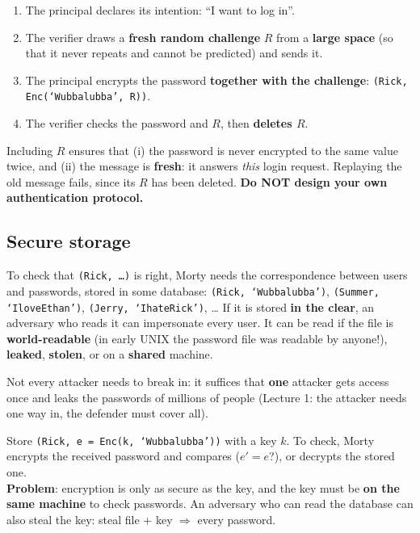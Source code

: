 \begin{defnbox}[title=Challenge-response protocols (solution to replay attacks)]
\begin{enumerate}
  \item The principal declares its intention: ``I want to log in''.
  \item The verifier draws a \textbf{fresh random challenge} $R$ from a \textbf{large space} (so
        that it never repeats and cannot be predicted) and sends it.
  \item The principal encrypts the password \textbf{together with the challenge}:
        \texttt{(Rick, Enc(`Wubbalubba', R))}.
  \item The verifier checks the password and $R$, then \textbf{deletes $R$}.
\end{enumerate}
Including $R$ ensures that (i) the password is never encrypted to the same value twice, and (ii)
the message is \textbf{fresh}: it answers \emph{this} login request. Replaying the old message
fails, since its $R$ has been deleted. \textbf{Do NOT design your own authentication protocol.}
\end{defnbox}

\subsection{Secure storage}

\begin{defnbox}[title=Why storage matters]
To check that \texttt{(Rick, \ldots)} is right, Morty needs the correspondence between users and
passwords, stored in some database: \texttt{(Rick, `Wubbalubba')}, \texttt{(Summer,
`IloveEthan')}, \texttt{(Jerry, `IhateRick')}, \ldots{} If it is stored \textbf{in the clear}, an
adversary who reads it can impersonate every user. It can be read if the file is
\textbf{world-readable} (in early UNIX the password file was readable by anyone!),
\textbf{leaked}, \textbf{stolen}, or on a \textbf{shared} machine.
\end{defnbox}

\begin{warnbox}[title=Asymmetry attacker vs.\ defender]
Not every attacker needs to break in: it suffices that \textbf{one} attacker gets access once
and leaks the passwords of millions of people (Lecture 1: the attacker needs one way in, the
defender must cover all).
\end{warnbox}

\begin{defnbox}[title={Option 1: store passwords encrypted --- not enough}]
Store \texttt{(Rick, e = Enc(k, `Wubbalubba'))} with a key $k$. To check, Morty encrypts the
received password and compares ($e' = e$?), or decrypts the stored one. \\
\textbf{Problem}: encryption is only as secure as the key, and the key must be \textbf{on the same
machine} to check passwords. An adversary who can read the database can also steal the key: steal
file + key $\Rightarrow$ every password.
\end{defnbox}

